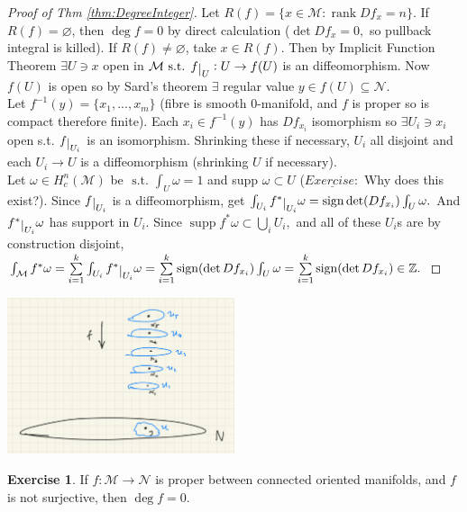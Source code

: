 \documentclass[10pt]{article}
\theoremstyle{plain}
\theoremstyle{definition}
\newtheorem{exercise}[thm]{Exercise}
\newcommand{\st}{\text{ s.t. }}
\newcommand{\man}{\mathcal{M}}
\newcommand{\nan}{\mathcal{N}}
\newcommand{\xman}{x\in\man}
\newcommand{\allthe}[3]{{#1}_{#2},...,{#1}_{#3}}
\newcommand{\sumfromto}[2]{\sum\limits_{#1}^{#2}}
\def\restrict#1{\raise-.5ex\hbox{\ensuremath|}_{#1}}
\newcommand{\compactcohomman}[1]{H_c^{#1}(\man)}
\DeclareMathOperator{\rank}{rank}
\DeclareMathOperator{\sign}{sign}
\DeclareMathOperator{\supp}{supp }
\begin{document}
\begin{proof}[Proof of Thm \ref{thm:DegreeInteger}]
Let $R(f) = \{\xman : \rank Df_x = n\}$. If $R(f) = \varnothing$, then $\deg f = 0$ by direct calculation ($\det Df_x = 0,$ so pullback integral is killed). If $R(f) \neq\varnothing$, take $x \in R(f).$ Then by Implicit Function Theorem $\exists U \ni x$ open in $\man \st f\restrict{U} : U \to f(U)$ is an diffeomorphism. Now $f(U)$ is open so by Sard's theorem $\exists$ regular value $y\in f(U) \subseteq \nan$.\\
Let $f^{-1}(y) = \{\allthe{x}{1}{m} \}$ (fibre is smooth 0-manifold, and $f$ is proper so is compact therefore finite). Each $x_i \in f^{-1}(y)$ has $Df_{x_i}$ isomorphism so $\exists U_i \ni x_i$ open s.t. $f\restrict{U_i}$ is an isomorphism. Shrinking these if necessary, $U_i$ all disjoint and each $U_i \to U$ is a diffeomorphism (shrinking $U$ if necessary).\\
Let $\omega \in \compactcohomman{n}$ be $\st \int_U \omega = 1$ and supp $\omega \subset U$ ($\underline{Exercise:}$ Why does this exist?). Since $f\restrict{U_i}$ is a diffeomorphism, get $\int_{U_i} f^* \restrict{U_i} \omega = \sign \det(Df_{x_i}) \int_U \omega.$ And $f^*\restrict{U_i} \omega$ has support in $U_i$. Since $\supp f^*\omega \subset \bigcup\limits_{i} U_i,$ and all of these $U_i$s are by construction disjoint, $\int_\man f^*\omega = \sumfromto{i=1}{k} \int_{U_i} f^*\restrict{U_i} \omega = \sumfromto{i=1}{k} \sign(\det Df_{x_i}) \int_U \omega = \sumfromto{i=1}{k} \sign (\det Df_{x_i}) \in \mathbb{Z}.$
\end{proof}
\begin{center}
    \includegraphics[width = 0.5\textwidth]{DegreeCovering.png}
\end{center}

\begin{exercise}
If $f : \man \to \nan$ is proper between connected oriented manifolds, and $f$ is not surjective, then $\deg f = 0.$
\end{exercise}
\end{document}
